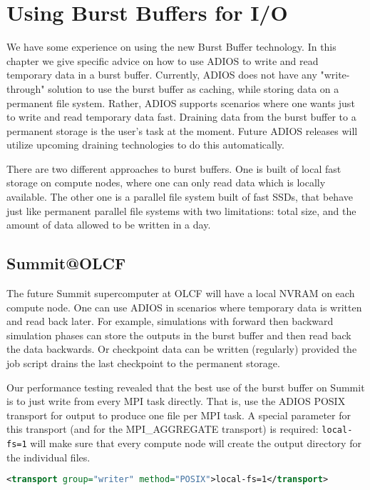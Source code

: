 \chapter{Using Burst Buffers for I/O}
\label{chapter-bb}

We have some experience on using the new Burst Buffer technology. In this chapter we give specific advice on how to use ADIOS to write and read temporary data in a burst buffer. Currently, ADIOS does not have any "write-through" solution to use the burst buffer as caching, while storing data on a permanent file system. Rather, ADIOS supports scenarios where one wants just to write and read temporary data fast. Draining data from the burst buffer to a permanent storage is the user's task at the moment. Future ADIOS releases will utilize upcoming draining technologies to do this automatically. 

There are two different approaches to burst buffers. One is built of local fast storage on compute nodes, where one can only read data which is locally available. The other one is a parallel file system built of fast SSDs, that behave just like permanent parallel file systems with two limitations: total size, and the amount of data allowed to be written in a day. 

\section{Summit@OLCF}

The future Summit supercomputer at OLCF will have a local NVRAM on each compute node. One can use ADIOS in scenarios where temporary data is written and read back later. For example, simulations with forward then backward simulation phases can store the outputs in the burst buffer and then read back the data backwards. Or checkpoint data can be written (regularly) provided the job script drains the last checkpoint to the permanent storage. 

Our performance testing revealed that the best use of the burst buffer on Summit is to just write from every MPI task directly. That is, use the ADIOS POSIX transport for output to produce one file per MPI task. A special parameter for this transport (and for the MPI_AGGREGATE transport) is required: \verb+local-fs=1+ will make sure that every compute node will create the output directory for the individual files. 


\begin{lstlisting}[language=XML]
<transport group="writer" method="POSIX">local-fs=1</transport>
\end{lstlisting}

